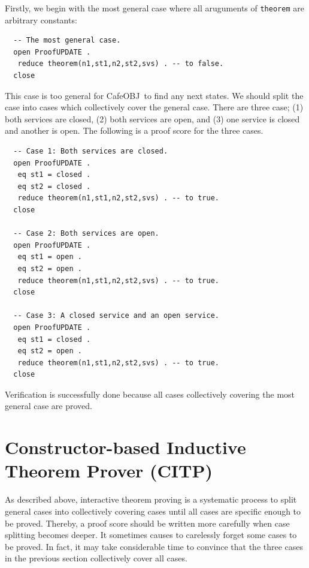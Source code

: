 \documentclass[12pt]{report}
\newcommand{\cafeobj}{{\sf CafeOBJ}~}
\begin{document}
Firstly, we begin with the most general case where all aruguments of
{\tt theorem} are arbitrary constants:
\small
\begin{verbatim}
  -- The most general case.
  open ProofUPDATE .
   reduce theorem(n1,st1,n2,st2,svs) . -- to false.
  close
\end{verbatim}
\normalsize
This case is too general for \cafeobj to find any next states.
We should split the case into cases which collectively cover
the general case.  There are three case; (1) both services are closed,
(2) both services are open, and (3) one service is closed and another
is open. The following is a proof score for the three cases.
\small
\begin{verbatim}
  -- Case 1: Both services are closed.
  open ProofUPDATE .
   eq st1 = closed .
   eq st2 = closed .
   reduce theorem(n1,st1,n2,st2,svs) . -- to true.
  close
  
  -- Case 2: Both services are open.
  open ProofUPDATE .
   eq st1 = open .
   eq st2 = open .
   reduce theorem(n1,st1,n2,st2,svs) . -- to true.
  close
  
  -- Case 3: A closed service and an open service.
  open ProofUPDATE .
   eq st1 = closed .
   eq st2 = open .
   reduce theorem(n1,st1,n2,st2,svs) . -- to true.
  close
\end{verbatim}
\normalsize
Verification is successfully done because all cases collectively covering
the most general case are proved.
\section{Constructor-based Inductive Theorem Prover (CITP)}
\label{sec:CITP}
As described above, interactive theorem proving is a systematic
process to split general cases into collectively covering cases until
all cases are specific enough to be proved. Thereby, a proof score should
be written more carefully when case splitting becomes deeper. It
sometimes causes to carelessly forget some cases to be proved. In
fact, it may take considerable time to convince that the three cases in
the previous section collectively cover all cases.
\end{document}
